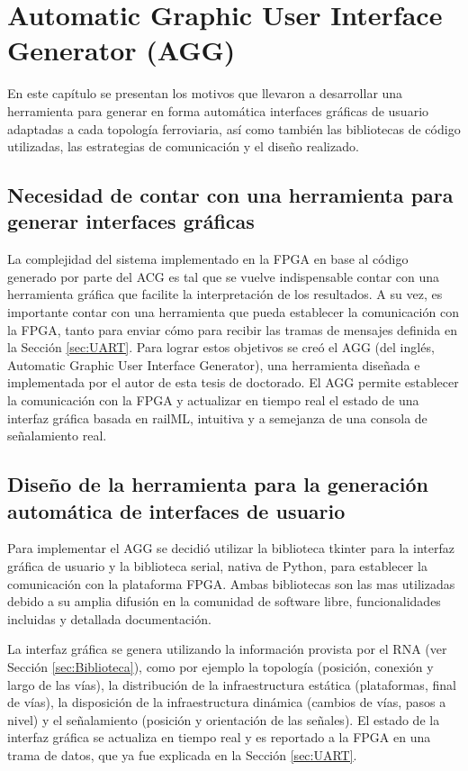 \chapter{Automatic Graphic User Interface Generator (AGG)}
	\label{sec:AGG}
	
	En este capítulo se presentan los motivos que llevaron a desarrollar una herramienta para generar en forma automática interfaces gráficas de usuario adaptadas a cada topología ferroviaria, así como también las bibliotecas de código utilizadas, las estrategias de comunicación y el diseño realizado.
	
	\section{Necesidad de contar con una herramienta para generar interfaces gráficas}
	
	La complejidad del sistema implementado en la FPGA en base al código generado por parte del ACG es tal que se vuelve indispensable contar con una herramienta gráfica que facilite la interpretación de los resultados. A su vez, es importante contar con una herramienta que pueda establecer la comunicación con la FPGA, tanto para enviar cómo para recibir las tramas de mensajes definida en la Sección \ref{sec:UART}. Para lograr estos objetivos se creó el AGG (del inglés, Automatic Graphic User Interface Generator), una herramienta diseñada e implementada por el autor de esta tesis de doctorado. El AGG permite establecer la comunicación con la FPGA y actualizar en tiempo real el estado de una interfaz gráfica basada en railML, intuitiva y a semejanza de una consola de señalamiento real.
	
	\section{Diseño de la herramienta para la generación automática de interfaces de usuario}
	\label{sec:AGG_rutas}
	
	Para implementar el AGG se decidió utilizar la biblioteca tkinter \cite{TKINTER} para la interfaz gráfica de usuario y la biblioteca serial, nativa de Python, para establecer la comunicación con la plataforma FPGA. Ambas bibliotecas son las mas utilizadas debido a su amplia difusión en la comunidad de software libre, funcionalidades incluidas y detallada documentación.
	
	La interfaz gráfica se genera utilizando la información provista por el RNA (ver Sección \ref{sec:Biblioteca}), como por ejemplo la topología (posición, conexión y largo de las vías), la distribución de la infraestructura estática (plataformas, final de vías), la disposición de la infraestructura dinámica (cambios de vías, pasos a nivel) y el señalamiento (posición y orientación de las señales). El estado de la interfaz gráfica se actualiza en tiempo real y es reportado a la FPGA en una trama de datos, que ya fue explicada en la Sección \ref{sec:UART}.
	
